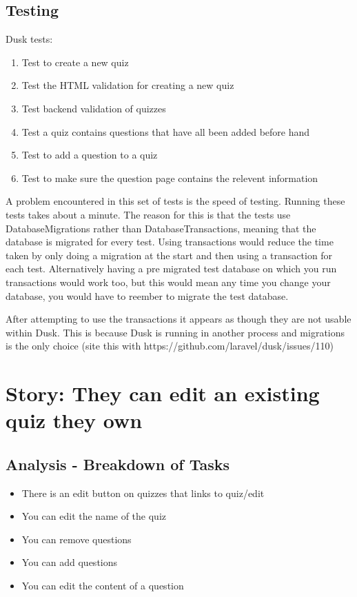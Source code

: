 \documentclass{article}
\begin{document}
\subsection{Testing}
Dusk tests:
\begin{enumerate}
	\item Test to create a new quiz
	\item Test the HTML validation for creating a new quiz
	\item Test backend validation of quizzes
	\item Test a quiz contains questions that have all been added before hand
	\item Test to add a question to a quiz
	\item Test to make sure the question page contains the relevent information
\end{enumerate}
A problem encountered in this set of tests is the speed of testing. Running these tests takes about a minute. The reason for this is that the tests use DatabaseMigrations rather than DatabaseTransactions, meaning that the database is migrated for every test. Using transactions would reduce the time taken by only doing a migration at the start and then using a transaction for each test. Alternatively having a pre migrated test database on which you run transactions would work too, but this would mean any time you change your database, you would have to reember to migrate the test database. 

After attempting to use the transactions it appears as though they are not usable within Dusk. This is because Dusk is running in another process and migrations is the only choice (site this with https://github.com/laravel/dusk/issues/110) 
\newpage

\section{Story: They can edit an existing quiz they own}
\subsection{Analysis - Breakdown of Tasks}
\begin{itemize}
	\item There is an edit button on quizzes that links to quiz/edit
	\item You can edit the name of the quiz
	\item You can remove questions
	\item You can add questions
	\item You can edit the content of a question
\end{itemize}
\end{document}
